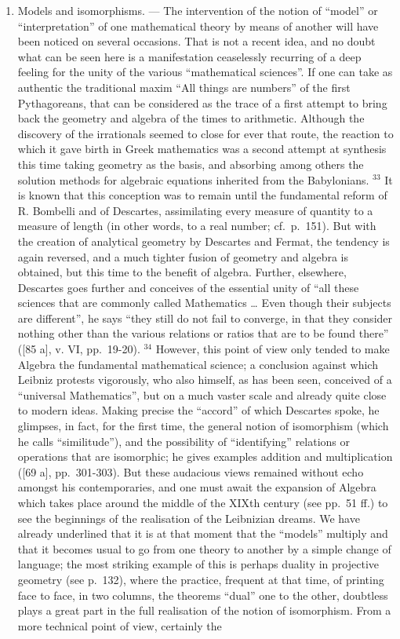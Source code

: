 \begin{enumerate}
\def\labelenumi{\Alph{enumi})}
\setcounter{enumi}{1}
\item
  Models and isomorphisms. --- The intervention of the notion of ``model'' or ``interpretation'' of one mathematical theory by means of another will have been noticed on several occasions. That is not a recent idea, and no doubt what can be seen here is a manifestation ceaselessly recurring of a deep feeling for the unity of the various ``mathematical sciences''. If one can take as authentic the traditional maxim ``All things are numbers'' of the first Pythagoreans, that can be considered as the trace of a first attempt to bring back the geometry and algebra of the times to arithmetic. Although the discovery of the irrationals seemed to close for ever that route, the reaction to which it gave birth in Greek mathematics was a second attempt at synthesis this time taking geometry as the basis, and absorbing among others the solution methods for algebraic equations inherited from the Babylonians. \(^{33}\) It is known that this conception was to remain until the fundamental reform of R. Bombelli and of Descartes, assimilating every measure of quantity to a measure of length (in other words, to a real number; cf.~p.~151). But with the creation of analytical geometry by Descartes and Fermat, the tendency is again reversed, and a much tighter fusion of geometry and algebra is obtained, but this time to the benefit of algebra. Further, elsewhere, Descartes goes further and conceives of the essential unity of ``all these sciences that are commonly called Mathematics \ldots{} Even though their subjects are different'', he says ``they still do not fail to converge, in that they consider nothing other than the various relations or ratios that are to be found there'' ({[}85 a{]}, v. VI, pp.~19-20). \(^{34}\) However, this point of view only tended to make Algebra the fundamental mathematical science; a conclusion against which Leibniz protests vigorously, who also himself, as has been seen, conceived of a ``universal Mathematics'', but on a much vaster scale and already quite close to modern ideas. Making precise the ``accord'' of which Descartes spoke, he glimpses, in fact, for the first time, the general notion of isomorphism (which he calls ``similitude''), and the possibility of ``identifying'' relations or operations that are isomorphic; he gives examples addition and multiplication ({[}69 a{]}, pp.~301-303). But these audacious views remained without echo amongst his contemporaries, and one must await the expansion of Algebra which takes place around the middle of the XIXth century (see pp.~51 ff.) to see the beginnings of the realisation of the Leibnizian dreams. We have already underlined that it is at that moment that the ``models'' multiply and that it becomes usual to go from one theory to another by a simple change of language; the most striking example of this is perhaps duality in projective geometry (see p.~132), where the practice, frequent at that time, of printing face to face, in two columns, the theorems ``dual'' one to the other, doubtless plays a great part in the full realisation of the notion of isomorphism. From a more technical point of view, certainly the 
\end{enumerate}
